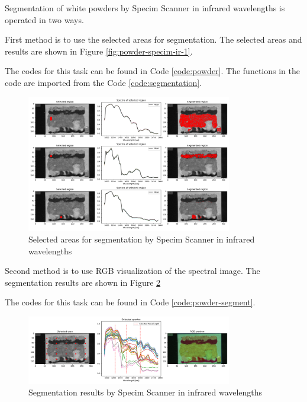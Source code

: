 Segmentation of white powders by Specim Scanner in infrared wavelengths is operated in two ways.

First method is to use the selected areas for segmentation. The selected areas and results are shown in Figure \ref{fig:powder-specim-ir-1}. 

The codes for this task can be found in Code \ref{code:powder}. The functions in the code are imported from the Code \ref{code:segmentation}.

\begin{figure}[H]
  \centering
  \includegraphics[width=0.8\textwidth]{./fig/task3/powder.png}
  \caption{Selected areas for segmentation by Specim Scanner in infrared wavelengths}
  \label{fig:powder}
\end{figure}

Second method is to use RGB visualization of the spectral image. The segmentation results are shown in Figure \ref{fig:powder-seg}

The codes for this task can be found in Code \ref{code:powder-segment}.

\begin{figure}[H]
  \centering
  \includegraphics[width=0.8\textwidth]{./fig/task3/powder-segment.png}
  \caption{Segmentation results by Specim Scanner in infrared wavelengths}
  \label{fig:powder-seg}
\end{figure}
